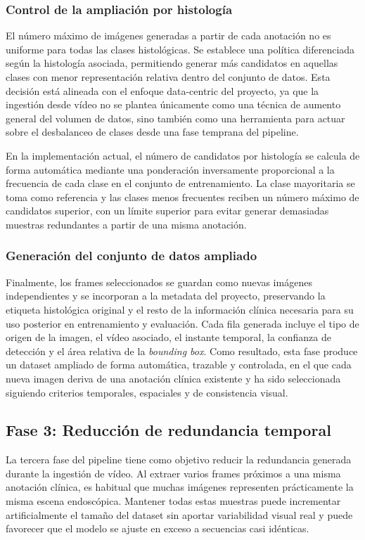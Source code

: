 ﻿\documentclass[10pt,a4paper,twocolumn,twoside]{article}
\begin{document}
\subsubsection{Control de la ampliación por histología}

El número máximo de imágenes generadas a partir de cada anotación no es uniforme para todas las clases histológicas. Se establece una política diferenciada según la histología asociada, permitiendo generar más candidatos en aquellas clases con menor representación relativa dentro del conjunto de datos. Esta decisión está alineada con el enfoque data-centric del proyecto, ya que la ingestión desde vídeo no se plantea únicamente como una técnica de aumento general del volumen de datos, sino también como una herramienta para actuar sobre el desbalanceo de clases desde una fase temprana del pipeline.

En la implementación actual, el número de candidatos por histología se calcula de forma automática mediante una ponderación inversamente proporcional a la frecuencia de cada clase en el conjunto de entrenamiento. La clase mayoritaria se toma como referencia y las clases menos frecuentes reciben un número máximo de candidatos superior, con un límite superior para evitar generar demasiadas muestras redundantes a partir de una misma anotación.

\subsubsection{Generación del conjunto de datos ampliado}
Finalmente, los frames seleccionados se guardan como nuevas imágenes independientes y se incorporan a la metadata del proyecto, preservando la etiqueta histológica original y el resto de la información clínica necesaria para su uso posterior en entrenamiento y evaluación. Cada fila generada incluye el tipo de origen de la imagen, el vídeo asociado, el instante temporal, la confianza de detección y el área relativa de la \textit{bounding box}. Como resultado, esta fase produce un dataset ampliado de forma automática, trazable y controlada, en el que cada nueva imagen deriva de una anotación clínica existente y ha sido seleccionada siguiendo criterios temporales, espaciales y de consistencia visual.

\subsection{Fase 3: Reducción de redundancia temporal}
La tercera fase del pipeline tiene como objetivo reducir la redundancia generada durante la ingestión de vídeo. Al extraer varios frames próximos a una misma anotación clínica, es habitual que muchas imágenes representen prácticamente la misma escena endoscópica. Mantener todas estas muestras puede incrementar artificialmente el tamaño del dataset sin aportar variabilidad visual real y puede favorecer que el modelo se ajuste en exceso a secuencias casi idénticas.
\end{document}
